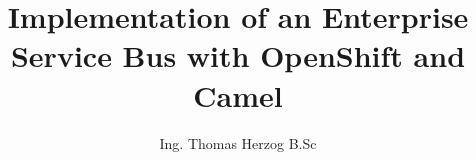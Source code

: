 \documentclass[master,english]{hgbthesis}
\title{Implementation of an Enterprise Service Bus with OpenShift and Camel}
\author{Ing. Thomas Herzog B.Sc}
\begin{document}

\frontmatter							%

\maketitle
\tableofcontents



\mainmatter          			%











\appendix                                         %


\MakeBibliography                     				%
%

\end{document}
